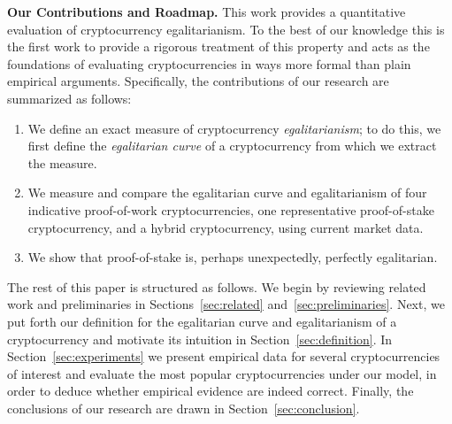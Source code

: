 \noindent
\textbf{Our Contributions and Roadmap.}
This work provides a quantitative evaluation of cryptocurrency egalitarianism.
To the best of our knowledge this is the first work to provide a rigorous
treatment of this property and acts as the foundations of evaluating
cryptocurrencies in ways more formal than plain empirical arguments.
Specifically, the contributions of our research are summarized as follows:

\begin{enumerate}
  \item We define an exact measure of cryptocurrency
        \emph{egalitarianism}; to do this, we first define the \emph{egalitarian curve} of a
        cryptocurrency from which we extract the measure.
  \item We measure and compare the egalitarian curve and egalitarianism of
        four indicative proof-of-work cryptocurrencies, one representative
        proof-of-stake cryptocurrency, and a hybrid cryptocurrency, using
        current market data.
  \item We show that proof-of-stake is, perhaps unexpectedly, perfectly
        egalitarian.
\end{enumerate}

The rest of this paper is structured as follows. We begin by reviewing related
work and preliminaries in Sections~\ref{sec:related}
and~\ref{sec:preliminaries}. Next, we put forth our definition for the
egalitarian curve and egalitarianism of a cryptocurrency and motivate its
intuition in Section~\ref{sec:definition}. In Section~\ref{sec:experiments} we
present empirical data for several cryptocurrencies of interest and evaluate
the most popular cryptocurrencies under our model, in order to deduce whether
empirical evidence are indeed correct. Finally, the conclusions of our research
are drawn in Section~\ref{sec:conclusion}.
